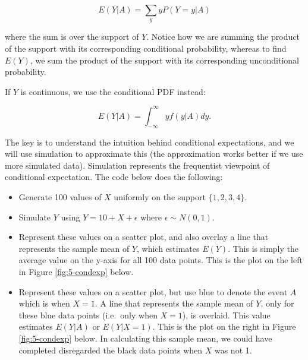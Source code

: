 \documentclass[
]{book}
\providecommand{\tightlist}{%
  \setlength{\itemsep}{0pt}\setlength{\parskip}{0pt}}
\begin{document}
\begin{equation} 
E(Y|A) = \sum_y y P(Y=y|A) 
\label{eq:5-condexpdis}
\end{equation}

where the sum is over the support of \(Y\). Notice how we are summing the product of the support with its corresponding conditional probability, whereas to find \(E(Y)\), we sum the product of the support with its corresponding unconditional probability.

If \(Y\) is continuous, we use the conditional PDF instead:

\begin{equation} 
E(Y|A) = \int_{-\infty}^{\infty} y f(y|A) dy.
\label{eq:5-condexpcont}
\end{equation}

The key is to understand the intuition behind conditional expectations, and we will use simulation to approximate this (the approximation works better if we use more simulated data). Simulation represents the frequentist viewpoint of conditional expectation. The code below does the following:

\begin{itemize}
\tightlist
\item
  Generate 100 values of \(X\) uniformly on the support \(\{1,2,3,4\}\).
\item
  Simulate \(Y\) using \(Y = 10 + X + \epsilon\) where \(\epsilon \sim N(0,1)\).
\item
  Represent these values on a scatter plot, and also overlay a line that represents the sample mean of \(Y\), which estimates \(E(Y)\). This is simply the average value on the y-axis for all 100 data points. This is the plot on the left in Figure \ref{fig:5-condexp} below.
\item
  Represent these values on a scatter plot, but use blue to denote the event \(A\) which is when \(X=1\). A line that represents the sample mean of \(Y\), only for these blue data points (i.e.~only when \(X=1\)), is overlaid. This value estimates \(E(Y|A)\) or \(E(Y|X=1)\). This is the plot on the right in Figure \ref{fig:5-condexp} below. In calculating this sample mean, we could have completed disregarded the black data points when \(X\) was not 1.
\end{itemize}
\end{document}
